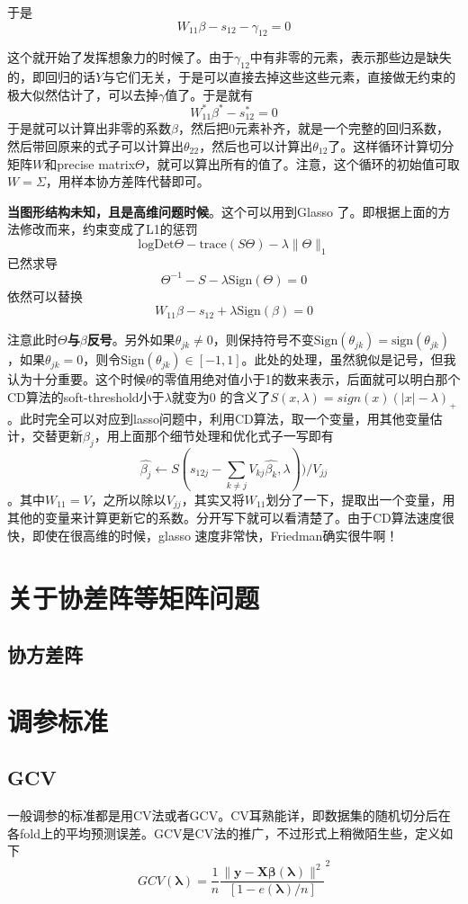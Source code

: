 ﻿\documentclass[hyperref,12pt]{ctexart}
\begin{document}
于是
\[
W_{11} \beta - s_{12} - \gamma_{12} = 0
\]

这个就开始了发挥想象力的时候了。由于$\gamma_{12}$中有非零的元素，表示那些边是缺失的，即回归的话$Y$与它们无关，于是可以直接去掉这些这些元素，直接做无约束的极大似然估计了，可以去掉$\gamma$值了。于是就有
\[
W^{*}_{11}\beta^{*} - s_{12}^{*} = 0
\]
于是就可以计算出非零的系数$\beta$，然后把0元素补齐，就是一个完整的回归系数，然后带回原来的式子可以计算出$\theta_{22}$，然后也可以计算出$\theta_{12}$了。这样循环计算切分矩阵$W$和precise matrix$\Theta$，就可以算出所有的值了。注意，这个循环的初始值可取$W = \Sigma$，用样本协方差阵代替即可。

\textbf{当图形结构未知，且是高维问题时候}。这个可以用到Glasso 了。即根据上面的方法修改而来，约束变成了L1的惩罚
\[
\text{logDet}\Theta - \text{trace}(S\Theta) - \lambda \|\Theta\|_1
\]
已然求导
\[
\Theta^{-1} - S - \lambda \text{Sign}(\Theta) = 0
\]
依然可以替换
\[
W_{11} \beta - s_{12} + \lambda\text{Sign}(\beta) = 0
\]

注意此时\textbf{$\Theta$与$\beta$反号}。另外如果$\theta_{jk} \neq 0$，则保持符号不变$\text{Sign}(\theta_{jk}) = \text{sign}(\theta_{jk})$，如果$\theta_{jk} = 0$，则令$\text{Sign}(\theta_{jk}) \in [-1, 1]$。此处的处理，虽然貌似是记号，但我认为十分重要。这个时候$\theta$的零值用绝对值小于1的数来表示，后面就可以明白那个CD算法的soft-threshold小于$\lambda$就变为0 的含义了$S(x, \lambda) = sign(x)(|x| - \lambda)_{+}$。此时完全可以对应到lasso问题中，利用CD算法，取一个变量，用其他变量估计，交替更新$\beta_j$，用上面那个细节处理和优化式子一写即有
\[
\hat{\beta_j} \leftarrow S(s_{12j} - \sum_{k \neq j}V_{kj}\hat{\beta_k}, \lambda))/V_{jj}
\]
。其中$W_{11} = V$，之所以除以$V_{jj}$，其实又将$W_{11}$划分了一下，提取出一个变量，用其他的变量来计算更新它的系数。分开写下就可以看清楚了。由于CD算法速度很快，即使在很高维的时候，glasso 速度非常快，Friedman确实很牛啊！

\section{关于协差阵等矩阵问题}
\subsection{协方差阵}

\section{调参标准}
\subsection{GCV}
一般调参的标准都是用CV法或者GCV。CV耳熟能详，即数据集的随机切分后在各fold上的平均预测误差。GCV是CV法的推广，不过形式上稍微陌生些，定义如下
\[
GCV(\boldsymbol{\lambda}) = \frac{1}{n}\frac{\|\mathbf{y} - \mathbf{X}\boldsymbol{\beta(\lambda)}\|^2}{[1 - e(\boldsymbol{\lambda})/n]}^2
\]
\end{document}
